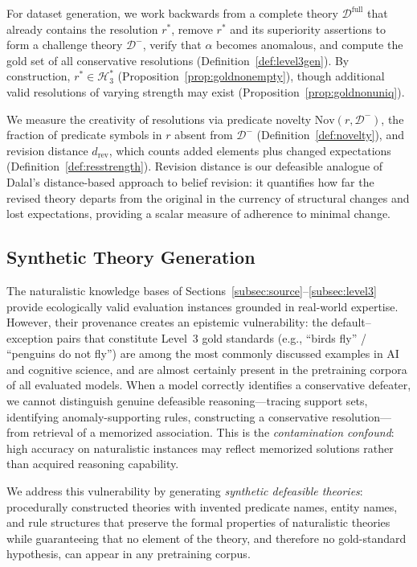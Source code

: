 \documentclass{article}
\theoremstyle{definition}
\newcommand{\Dm}{\mathcal{D}^{-}}
\newcommand{\Dfull}{\mathcal{D}^{\mathrm{full}}}
\newcommand{\Rgold}{\mathcal{H}^{*}_3}
\newcommand{\Nov}{\mathrm{Nov}}
\begin{document}
For dataset generation, we work backwards from a complete theory $\Dfull$ that already contains the resolution $r^*$, remove $r^*$ and its superiority assertions to form a challenge theory $\Dm$, verify that $\alpha$ becomes anomalous, and compute the gold set of all conservative resolutions (Definition~\ref{def:level3gen}). By construction, $r^* \in \Rgold$ (Proposition~\ref{prop:goldnonempty}), though additional valid resolutions of varying strength may exist (Proposition~\ref{prop:goldnonuniq}).

We measure the creativity of resolutions via predicate novelty $\Nov(r, \Dm)$, the fraction of predicate symbols in $r$ absent from $\Dm$ (Definition~\ref{def:novelty}), and revision distance $d_{\mathrm{rev}}$, which counts added elements plus changed expectations (Definition~\ref{def:resstrength}). Revision distance is our defeasible analogue of Dalal's \cite{dalal1988investigations} distance-based approach to belief revision: it quantifies how far the revised theory departs from the original in the currency of structural changes and lost expectations, providing a scalar measure of adherence to minimal change.


\subsection{Synthetic Theory Generation}\label{subsec:synthetic}

The naturalistic knowledge bases of Sections~\ref{subsec:source}--\ref{subsec:level3} provide ecologically valid evaluation instances grounded in real-world expertise. However, their provenance creates an epistemic vulnerability: the default--exception pairs that constitute Level~3 gold standards (e.g., ``birds fly'' / ``penguins do not fly'') are among the most commonly discussed examples in AI and cognitive science, and are almost certainly present in the pretraining corpora of all evaluated models. When a model correctly identifies a conservative defeater, we cannot distinguish genuine defeasible reasoning---tracing support sets, identifying anomaly-supporting rules, constructing a conservative resolution---from retrieval of a memorized association. This is the \emph{contamination confound}: high accuracy on naturalistic instances may reflect memorized solutions rather than acquired reasoning capability.

We address this vulnerability by generating \emph{synthetic defeasible theories}: procedurally constructed theories with invented predicate names, entity names, and rule structures that preserve the formal properties of naturalistic theories while guaranteeing that no element of the theory, and therefore no gold-standard hypothesis, can appear in any pretraining corpus.
\end{document}
